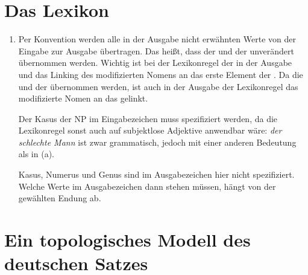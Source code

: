 \section{Das Lexikon}

\begin{enumerate}
\item
\eas 
{}
\zs
Per Konvention werden alle in der Ausgabe nicht erwähnten Werte von der Eingabe zur Ausgabe
übertragen. Das heißt, dass der \argstw und der \contw unverändert übernommen werden. Wichtig ist
bei der Lexikonregel der \modw in der Ausgabe und das Linking des modifizierten Nomens an das erste
Element der \argstl. Da die \argstl und der \contw übernommen werden, ist auch in der Ausgabe der
Lexikonregel das modifizierte Nomen an das \argone gelinkt.

Der Kasus der NP im Eingabezeichen muss spezifiziert werden, da die Lexikonregel sonst auch auf
subjektlose Adjektive anwendbar wäre:
\eal
{}
\zl
\emph{der schlechte Mann} ist zwar grammatisch, jedoch mit einer anderen Bedeutung als in (a).

Kasus, Numerus und Genus sind im Ausgabezeichen hier nicht spezifiziert. Welche Werte im
Ausgabezeichen dann stehen müssen, hängt von der gewählten Endung ab.

\end{enumerate}

\section{Ein topologisches Modell des deutschen Satzes}

